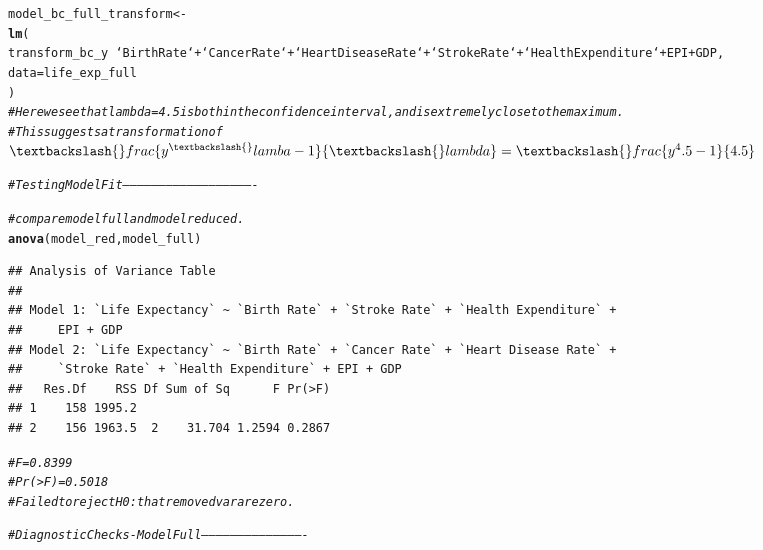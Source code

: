 \documentclass{article}\usepackage[]{graphicx}\usepackage[]{color}
\makeatletter
\newcommand{\hlcom}[1]{\textcolor[rgb]{0.678,0.584,0.686}{\textit{#1}}}%
\newcommand{\hlopt}[1]{\textcolor[rgb]{0,0,0}{#1}}%
\newcommand{\hlstd}[1]{\textcolor[rgb]{0.345,0.345,0.345}{#1}}%
\newcommand{\hlkwb}[1]{\textcolor[rgb]{0.69,0.353,0.396}{#1}}%
\newcommand{\hlkwc}[1]{\textcolor[rgb]{0.333,0.667,0.333}{#1}}%
\newcommand{\hlkwd}[1]{\textcolor[rgb]{0.737,0.353,0.396}{\textbf{#1}}}%
\newenvironment{kframe}{%
 \def\at@end@of@kframe{}%
 \ifinner\ifhmode%
  \def\at@end@of@kframe{\end{minipage}}%
  \begin{minipage}{\columnwidth}%
 \fi\fi%
 \def\FrameCommand##1{\hskip\@totalleftmargin \hskip-\fboxsep
 \colorbox{shadecolor}{##1}\hskip-\fboxsep
     \hskip-\linewidth \hskip-\@totalleftmargin \hskip\columnwidth}%
 \MakeFramed {\advance\hsize-\width
   \@totalleftmargin\z@ \linewidth\hsize
   \@setminipage}}%
 {\par\unskip\endMakeFramed%
 \at@end@of@kframe}
\newenvironment{knitrout}{}{} %
\makeatother
\begin{document}
\begin{knitrout}
\begin{kframe}
\begin{alltt}
\hlstd{model_bc_full_transform} \hlkwb{<-}
  \hlkwd{lm}\hlstd{(}
    \hlstd{transform_bc_y} \hlopt{~} \hlstd{`Birth Rate`} \hlopt{+} \hlstd{`Cancer Rate`} \hlopt{+} \hlstd{`Heart Disease Rate`} \hlopt{+} \hlstd{`Stroke Rate`} \hlopt{+} \hlstd{`Health Expenditure`} \hlopt{+} \hlstd{EPI} \hlopt{+} \hlstd{GDP,}
    \hlkwc{data} \hlstd{= life_exp_full}
  \hlstd{)}
\hlcom{# Here we see that lambda = 4.5 is both in the confidence interval, and is extremely close to the maximum. }
\hlcom{# This suggests a transformation of $\textbackslash{}frac\{y^\textbackslash{}lamba - 1\}\{\textbackslash{}lambda\} = \textbackslash{}frac\{y^4.5 - 1\}\{4.5\}$}

\hlcom{# Testing Model Fit -------------------------------------------------------}

\hlcom{# compare model full and model reduced.}
\hlkwd{anova}\hlstd{(model_red, model_full)}
\end{alltt}
\begin{verbatim}
## Analysis of Variance Table
## 
## Model 1: `Life Expectancy` ~ `Birth Rate` + `Stroke Rate` + `Health Expenditure` + 
##     EPI + GDP
## Model 2: `Life Expectancy` ~ `Birth Rate` + `Cancer Rate` + `Heart Disease Rate` + 
##     `Stroke Rate` + `Health Expenditure` + EPI + GDP
##   Res.Df    RSS Df Sum of Sq      F Pr(>F)
## 1    158 1995.2                           
## 2    156 1963.5  2    31.704 1.2594 0.2867
\end{verbatim}
\begin{alltt}
\hlcom{# F = 0.8399}
\hlcom{# Pr(>F) = 0.5018}
\hlcom{# Failed to reject H0: that removed var are zero.}

\hlcom{# Diagnostic Checks - Model Full -------------------------------------------}



\end{alltt}
\end{kframe}
\end{knitrout}
\end{document}
